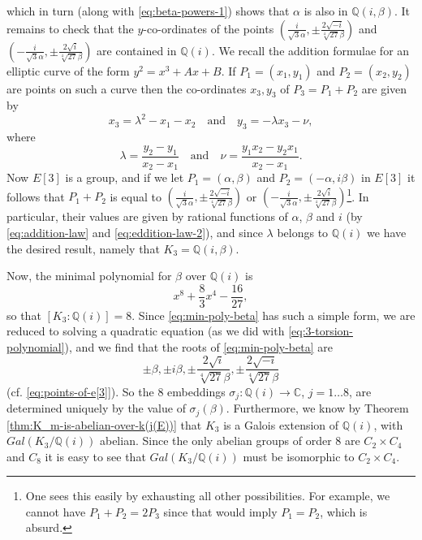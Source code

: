 which in turn (along with \eqref{eq:beta-powers-1}) shows that $\alpha$ is also in
$\mathbb{Q}(i,\beta)$.  It remains to check that the $y$-co-ordinates of the points
$(\frac{i}{\sqrt{3}\alpha}, \pm \frac{2 \sqrt{-i}}{\sqrt[4]{27}\beta} )$ and
$(-\frac{i}{\sqrt{3}\alpha}, \pm \frac{2 \sqrt{i}}{\sqrt[4]{27}\beta} )$ are
contained in $\mathbb{Q}(i)$.  We recall the addition formulae for an elliptic curve
of the form $y^{2} = x^{3} + Ax + B$.  If $P_{1} = (x_{1},y_{1})$ and $P_{2} =
(x_{2},y_{2})$ are points on such a curve then the co-ordinates $x_{3},y_{3}$ of
$P_{3} = P_{1} + P_{2}$ are given by
\begin{equation}
  \label{eq:addition-law}
  x_{3} = \lambda^{2} - x_{1} - x_{2} \quad \text{and} \quad  y_{3} = -\lambda x_{3}
  - \nu,
\end{equation}
where
\begin{equation}
  \label{eq:eddition-law-2}
  \lambda = \frac{y_{2} - y_{1}}{x_{2} - x_{1}} \quad \text{and} \quad \nu =
  \frac{y_{1}x_{2} - y_{2}x_{1}}{x_{2} - x_{1}}.
\end{equation}
Now $E[3]$ is a group, and if we let $P_{1} = (\alpha, \beta)$ and $P_{2} = (-\alpha,
i\beta)$ in $E[3]$ it follows that $P_{1} + P_{2}$ is equal to
$(\frac{i}{\sqrt{3}\alpha}, \pm \frac{2 \sqrt{-i}}{\sqrt[4]{27}\beta} )$ or
$(-\frac{i}{\sqrt{3}\alpha}, \pm \frac{2 \sqrt{i}}{\sqrt[4]{27}\beta} )$\footnote{One
  sees this easily by exhausting all other possibilities.  For example, we cannot
  have $P_{1} + P_{2} = 2P_{3}$ since that would imply $P_{1} = P_{2}$, which is
  absurd.}.  In particular, their values are given by rational functions of $\alpha$,
$\beta$ and $i$ (by \eqref{eq:addition-law} and \eqref{eq:eddition-law-2}), and since
$\lambda$ belongs to $\mathbb{Q}(i)$ we have the desired result, namely that $K_{3} =
\mathbb{Q}(i,\beta)$.

Now, the minimal polynomial for $\beta$ over $\mathbb{Q}(i)$ is
\begin{equation}
  \label{eq:min-poly-beta}
  x^{8} + \frac{8}{3}x^{4} - \frac{16}{27},
\end{equation}
so that $[K_{3} : \mathbb{Q}(i) ] = 8$.  Since \eqref{eq:min-poly-beta} has such a
simple form, we are reduced to solving a quadratic equation (as we did with
\eqref{eq:3-torsion-polynomial}), and we find that the roots of
\eqref{eq:min-poly-beta} are
\begin{equation*}
  \pm \beta, \pm i \beta, \pm \frac{2 \sqrt{i}}{\sqrt[4]{27}\beta}, \pm \frac{2 \sqrt{-i}}{\sqrt[4]{27}\beta}
\end{equation*}
(cf. \eqref{eq:points-of-e[3]}).  So the $8$ embeddings $\sigma_{j} : \mathbb{Q}(i)
\rightarrow \mathbb{C}$, $j = 1 \ldots 8$, are determined uniquely by the value of
$\sigma_{j}(\beta)$.  Furthermore, we know by Theorem
\ref{thm:K_m-is-abelian-over-k(j(E))} that $K_{3}$ is a Galois extension of
$\mathbb{Q}(i)$, with $Gal(K_{3}/\mathbb{Q}(i))$ abelian.  Since the only abelian
groups of order 8 are $C_{2} \times C_{4}$ and $C_{8}$ it is easy to see that
$Gal(K_{3}/\mathbb{Q}(i))$ must be isomorphic to $C_{2} \times C_{4}$.



